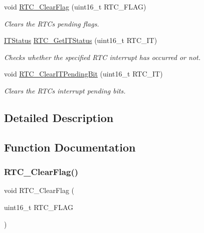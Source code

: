 \begin{DoxyCompactItemize}
void \mbox{\hyperlink{group___r_t_c___exported___functions_gacefb05730a77ffaa273c1ac3ade1a22f}{R\+T\+C\+\_\+\+Clear\+Flag}} (uint16\+\_\+t R\+T\+C\+\_\+\+F\+L\+AG)
\begin{DoxyCompactList}\small\item\em Clears the R\+TC\textquotesingle{}s pending flags. \end{DoxyCompactList}\item 
\mbox{\hyperlink{group___exported__types_gaacbd7ed539db0aacd973a0f6eca34074}{I\+T\+Status}} \mbox{\hyperlink{group___r_t_c___exported___functions_ga23274ad8aa28e86d5b0d58eee295db21}{R\+T\+C\+\_\+\+Get\+I\+T\+Status}} (uint16\+\_\+t R\+T\+C\+\_\+\+IT)
\begin{DoxyCompactList}\small\item\em Checks whether the specified R\+TC interrupt has occurred or not. \end{DoxyCompactList}\item 
void \mbox{\hyperlink{group___r_t_c___exported___functions_ga62b9a04d89a11f28db7dcfd50d9ee768}{R\+T\+C\+\_\+\+Clear\+I\+T\+Pending\+Bit}} (uint16\+\_\+t R\+T\+C\+\_\+\+IT)
\begin{DoxyCompactList}\small\item\em Clears the R\+TC\textquotesingle{}s interrupt pending bits. \end{DoxyCompactList}\end{DoxyCompactItemize}


\subsection{Detailed Description}


\subsection{Function Documentation}
\mbox{\label{group___r_t_c___exported___functions_gacefb05730a77ffaa273c1ac3ade1a22f}} 
\subsubsection{\texorpdfstring{RTC\_ClearFlag()}{RTC\_ClearFlag()}}
{\footnotesize\ttfamily void R\+T\+C\+\_\+\+Clear\+Flag (\begin{DoxyParamCaption}\item[{uint16\+\_\+t}]{R\+T\+C\+\_\+\+F\+L\+AG }\end{DoxyParamCaption})}



